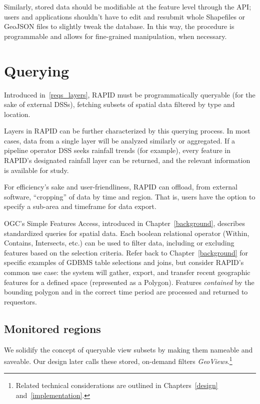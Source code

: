 Similarly, stored data should be modifiable at the feature level through the API; users and applications shouldn't have to edit and resubmit whole Shapefiles or GeoJSON files to slightly tweak the database. In this way, the procedure is programmable and allows for fine-grained manipulation, when necessary.

\section{Querying}

Introduced in~\ref{reqs_layers}, RAPID must be programmatically queryable (for the sake of external DSSs), fetching subsets of spatial data filtered by type and location.

Layers in RAPID can be further characterized by this querying process. In most cases, data from a single layer will be analyzed similarly or aggregated. If a pipeline operator DSS seeks rainfall trends (for example), every feature in RAPID's designated rainfall layer can be returned, and the relevant information is available for study.

For efficiency's sake and user-friendliness, RAPID can offload, from external software, ``cropping'' of data by time and region. That is, users have the option to specify a sub-area and timeframe for data export.

OGC's Simple Features Access, introduced in Chapter~\ref{background}, describes standardized queries for spatial data. Each boolean relational operator (Within, Contains, Intersects, etc.) can be used to filter data, including or excluding features based on the selection criteria. Refer back to Chapter~\ref{background} for specific examples of GDBMS table selections and joins, but consider RAPID's common use case: the system will gather, export, and transfer recent geographic features for a defined space (represented as a Polygon). Features \textit{contained} by the bounding polygon and in the correct time period are processed and returned to requestors.

\subsection{Monitored regions}
We solidify the concept of queryable view subsets by making them nameable and saveable. Our design later calls these stored, on-demand filters \textit{GeoViews}.\footnote{Related technical considerations are outlined in Chapters~\ref{design} and~\ref{implementation}.}

